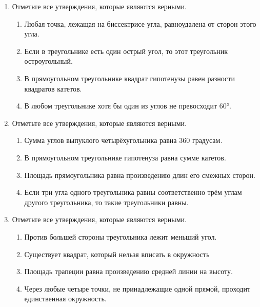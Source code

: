 \documentclass[a4paper,12pt]{article}
\newcommand{\taskspace}{\par\vspace{0.42cm}}
\begin{document}
\begin{enumerate}[resume]
\taskspace

\item Отметьте все утверждения, которые являются верными.
\begin{enumerate}[label=\arabic*),leftmargin=8mm,itemsep=0.25em,topsep=0.35em]
\item Любая точка, лежащая на биссектрисе угла, равноудалена от сторон этого угла.
\item Если в треугольнике есть один острый угол, то этот треугольник остроугольный.
\item В прямоугольном треугольнике квадрат гипотенузы равен разности квадратов катетов.
\item В любом треугольнике хотя бы один из углов не превосходит 60°.
\end{enumerate}

\taskspace

\item Отметьте все утверждения, которые являются верными.
\begin{enumerate}[label=\arabic*),leftmargin=8mm,itemsep=0.25em,topsep=0.35em]
\item Сумма углов выпуклого четырёхугольника равна 360 градусам.
\item В прямоугольном треугольнике гипотенуза равна сумме катетов.
\item Площадь прямоугольника равна произведению длин его смежных сторон.
\item Если три угла одного треугольника равны соответственно трём углам другого треугольника, то такие треугольники равны.
\end{enumerate}

\taskspace

\item Отметьте все утверждения, которые являются верными.
\begin{enumerate}[label=\arabic*),leftmargin=8mm,itemsep=0.25em,topsep=0.35em]
\item Против большей стороны треугольника лежит меньший угол.
\item Существует квадрат, который нельзя вписать в окружность
\item Площадь трапеции равна произведению средней линии на высоту.
\item Через любые четыре точки, не принадлежащие одной прямой, проходит единственная окружность.
\end{enumerate}

\taskspace


\end{enumerate}
\end{document}
